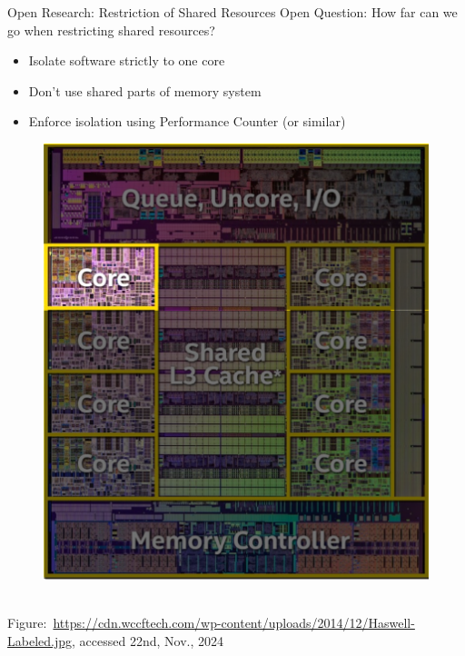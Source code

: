 \documentclass[aspectratio=169]{beamer}
\begin{document}
\begin{frame}{Open Research: Restriction of Shared Resources}
    Open Question: How far can we go when restricting shared resources?
    \bigskip
    \begin{minipage}{0.55\textwidth}
        \begin{itemize}
            \item Isolate software strictly to one core
            \item Don't use shared parts of memory system
            \item Enforce isolation using Performance Counter (or similar)
        \end{itemize}
    \end{minipage}
    \begin{minipage}{0.35\textwidth}
        \begin{figure}
            \includegraphics[width=.7\textwidth]{images/haswell_labeled_core.png}
        \end{figure}
    \end{minipage}\\
    \footnotesize{Figure:~\url{https://cdn.wccftech.com/wp-content/uploads/2014/12/Haswell-Labeled.jpg}, accessed 22nd, Nov., 2024}
\end{frame}
\end{document}
